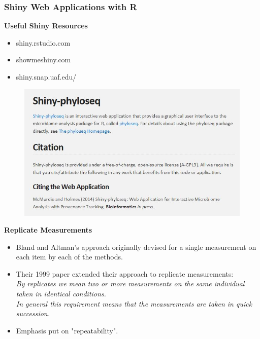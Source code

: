 \documentclass[compress]{beamer}        %
\makeatletter
\newcommand{\tcb}{\textcolor{beamer@blendedblue}}
\makeatother
\begin{document}
		\begin{frame}
			\frametitle{Shiny Web Applications with R}
			\Large
			\textbf{Useful Shiny Resources}
			\bigskip
			\begin{itemize}
				\item  shiny.rstudio.com \bigskip
				\item  showmeshiny.com \bigskip
				\item  shiny.snap.uaf.edu/ \bigskip
			\end{itemize}
		\end{frame}
		\begin{frame}
			\begin{figure}
				\centering
				\includegraphics[width=0.99\linewidth]{images/SHINYCITE}
			\end{figure}
			
		\end{frame}
		
		\begin{frame}{\bf \tcb{Replicate Measurements}}
			\large
			\begin{itemize}\itemsep0.7cm
				\item Bland and Altman's approach originally devised for a single measurement on each item by each of the methods.
				\item Their 1999 paper \cite{BA99} extended their approach to replicate measurements:\\ \emph{By replicates we mean two or more measurements on the same
					individual taken in identical conditions. \\In general this requirement means that the
					measurements are taken in quick succession. }
				\item Emphasis put on "repeatability".
			\end{itemize}
		\end{frame}
		
\end{document}
